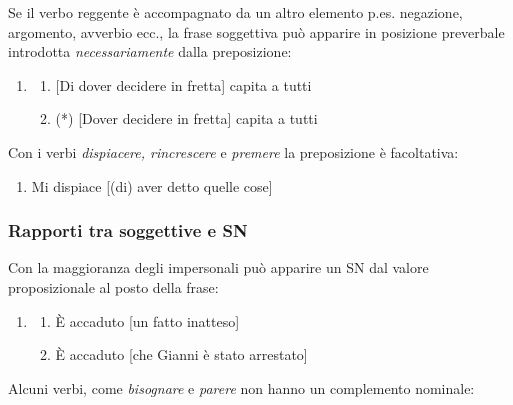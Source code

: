 \documentclass[
  a4paper,
  twoside,
  11pt,
  chapterprefix=false,
  bibliography=totocnumbered,
  listof=flat]{scrbook}
\providecommand{\tightlist}{%
  \setlength{\itemsep}{0pt}\setlength{\parskip}{0pt}}
\begin{document}
Se il verbo reggente è accompagnato da un altro elemento p.es. negazione, argomento, avverbio ecc., la frase soggettiva può apparire in posizione preverbale introdotta \emph{necessariamente} dalla preposizione:

\begin{enumerate}
\def\labelenumi{(\arabic{enumi})}
\setcounter{enumi}{45}
\item
  \begin{enumerate}
  \def\labelenumii{\alph{enumii}.}
  \tightlist
  \item
    {[}Di dover decidere in fretta{]} capita a tutti
  \item
    (*) {[}Dover decidere in fretta{]} capita a tutti
  \end{enumerate}
\end{enumerate}

Con i verbi \emph{dispiacere, rincrescere} e \emph{premere} la preposizione è facoltativa:

\begin{enumerate}
\def\labelenumi{(\arabic{enumi})}
\setcounter{enumi}{46}
\tightlist
\item
  Mi dispiace {[}(di) aver detto quelle cose{]}
\end{enumerate}

\hypertarget{rapporti-tra-soggettive-e-sn}{%
\subsubsection{Rapporti tra soggettive e SN}\label{rapporti-tra-soggettive-e-sn}}

Con la maggioranza degli impersonali può apparire un SN dal valore proposizionale al posto della frase:

\begin{enumerate}
\def\labelenumi{(\arabic{enumi})}
\setcounter{enumi}{47}
\item
  \begin{enumerate}
  \def\labelenumii{\alph{enumii}.}
  \tightlist
  \item
    È accaduto {[}un fatto inatteso{]}
  \item
    È accaduto {[}che Gianni è stato arrestato{]}
  \end{enumerate}
\end{enumerate}

Alcuni verbi, come \emph{bisognare} e \emph{parere} non hanno un complemento nominale:
\end{document}
